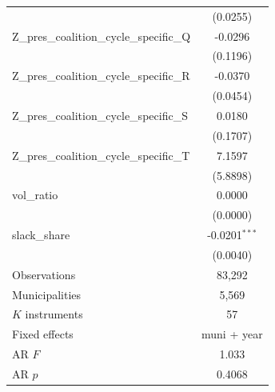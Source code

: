 \begin{tabular}{lc}
 & (0.0255) \\
Z\_pres\_coalition\_cycle\_specific\_Q & -0.0296 \\
 & (0.1196) \\
Z\_pres\_coalition\_cycle\_specific\_R & -0.0370 \\
 & (0.0454) \\
Z\_pres\_coalition\_cycle\_specific\_S & 0.0180 \\
 & (0.1707) \\
Z\_pres\_coalition\_cycle\_specific\_T & 7.1597 \\
 & (5.8898) \\
vol\_ratio & 0.0000 \\
 & (0.0000) \\
slack\_share & -0.0201$^{***}$ \\
 & (0.0040) \\
\midrule
Observations & 83,292 \\
Municipalities & 5,569 \\
$K$ instruments & 57 \\
Fixed effects & muni + year \\
AR $F$ & 1.033 \\
AR $p$ & 0.4068 \\
\bottomrule
\end{tabular}
